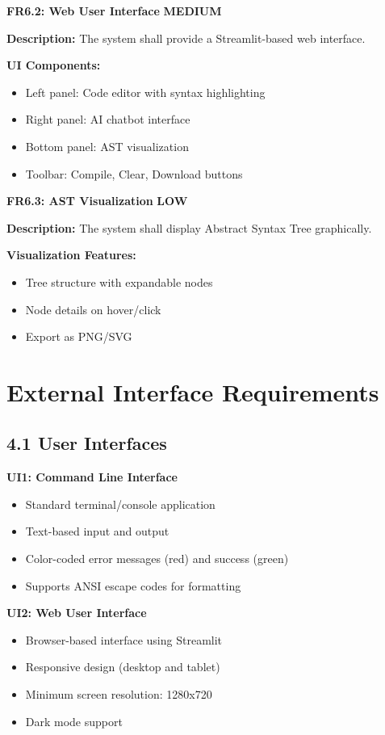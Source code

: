\documentclass[a4paper,11pt]{article}
\newcommand{\prioritymed}[1]{\colorbox{yellow!20}{\textbf{#1}}}
\newcommand{\prioritylow}[1]{\colorbox{green!20}{\textbf{#1}}}
\begin{document}
\vspace{3mm}
\textbf{FR6.2: Web User Interface} \prioritymed{MEDIUM}

\textbf{Description:} The system shall provide a Streamlit-based web interface.

\textbf{UI Components:}
\begin{itemize}
    \item Left panel: Code editor with syntax highlighting
    \item Right panel: AI chatbot interface
    \item Bottom panel: AST visualization
    \item Toolbar: Compile, Clear, Download buttons
\end{itemize}

\vspace{3mm}
\textbf{FR6.3: AST Visualization} \prioritylow{LOW}

\textbf{Description:} The system shall display Abstract Syntax Tree graphically.

\textbf{Visualization Features:}
\begin{itemize}
    \item Tree structure with expandable nodes
    \item Node details on hover/click
    \item Export as PNG/SVG
\end{itemize}

\clearpage

\section{External Interface Requirements}

\subsection{4.1 User Interfaces}

\textbf{UI1: Command Line Interface}
\begin{itemize}
    \item Standard terminal/console application
    \item Text-based input and output
    \item Color-coded error messages (red) and success (green)
    \item Supports ANSI escape codes for formatting
\end{itemize}

\textbf{UI2: Web User Interface}
\begin{itemize}
    \item Browser-based interface using Streamlit
    \item Responsive design (desktop and tablet)
    \item Minimum screen resolution: 1280x720
    \item Dark mode support
\end{itemize}
\end{document}
